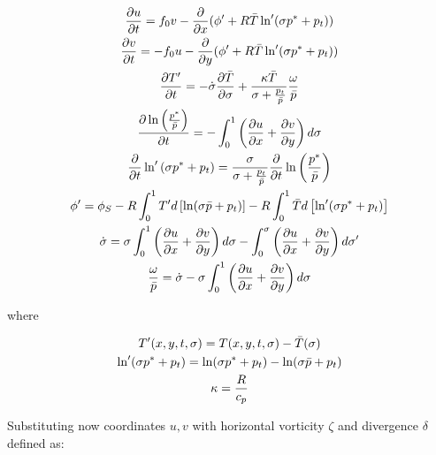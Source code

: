 \begin{gather}
  \label{linearized}
  \frac{\partial u}{\partial t} =
       f_0 v - \frac{\partial}{\partial x} (\phi^{\prime} +
       R\bar{T}\ln^{\prime}(\sigma p^{\ast} + p_t)) \\
  \frac{\partial v}{\partial t} =
       - f_0 u - \frac{\partial}{\partial y} (\phi^{\prime} +
       R\bar{T}\ln^{\prime}(\sigma p^{\ast} + p_t)) \\
  \frac{\partial T^\prime}{\partial t} =
     - \dot{\sigma} \frac{\partial \bar{T}}{\partial \sigma} +
     \frac{\kappa \bar{T}}{\sigma + \frac{p_t}{\bar{p}}}
     \frac{\omega}{\bar{p}} \\
  \label{2111a}
  \frac{\partial \ln\left(\frac{p^{\ast}}{\bar{p}}\right)}{\partial t} =
  -\int_0^1\left(\frac{\partial u}{\partial x} +
  \frac{\partial v}{\partial y} \right) d\sigma \\
  \label{2111b}
  \frac{\partial}{\partial t} \ln^{\prime}\left(\sigma p^{\ast} +
     p_t\right) = \frac{\sigma}{\sigma+\frac{p_t}{\bar{p}}}
        \frac{\partial}{\partial t}
        \ln\left(\frac{p^{\ast}}{\bar{p}}\right) \\
  \phi^{\prime} = \phi_S - R \int_0^1 T^{\prime}
    d \left[ \ln(\sigma \bar{p}+p_t)\right] -
    R \int_0^1 \bar{T} d \left[ \ln^{\prime}
    (\sigma p^{\ast}+p_t) \right] \\
  \dot{\sigma} = \sigma \int_0^1 \left(\frac{\partial u}{\partial x} +
  \frac{\partial v}{\partial y} \right) d\sigma -
  \int_0^{\sigma} \left(\frac{\partial u}{\partial x} +
  \frac{\partial v}{\partial y}\right) d\sigma^{\prime} \\
  \label{last_linearized}
  \frac{\omega}{\bar{p}} = \dot{\sigma} - \sigma
  \int_0^1 \left(\frac{\partial u}{\partial x} +
  \frac{\partial v}{\partial y}\right) d\sigma
\end{gather}

where

\begin{gather}
  T^{\prime}(x,y,t,\sigma) = T(x,y,t,\sigma) -
     \bar{T}(\sigma) \nonumber \\
  \ln^{\prime}(\sigma p^{\ast} + p_t) = \ln(\sigma p^{\ast} + p_t) -
    \ln(\sigma \bar{p} + p_t) \nonumber \\
  \kappa = \frac{R}{c_p} \nonumber
\end{gather}

Substituting now coordinates $u,v$ with horizontal vorticity $\zeta$ and
divergence $\delta$ defined as:

